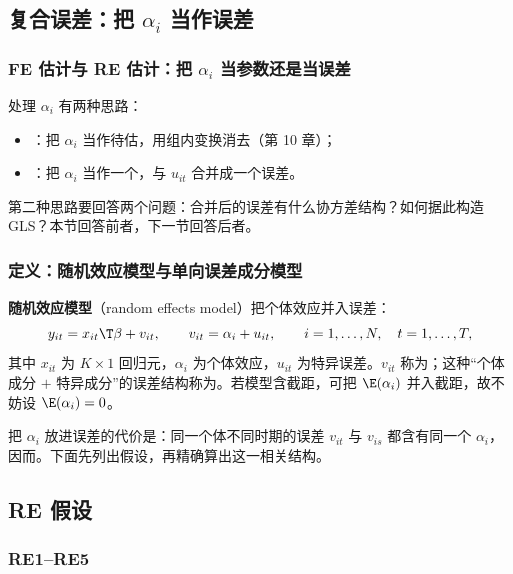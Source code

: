 \subsection{复合误差：把 \texorpdfstring{$\alpha_i$}{alpha\_i} 当作误差}

\subsubsection{FE 估计与 RE 估计：把 \texorpdfstring{$\alpha_i$}{alpha\_i} 当参数还是当误差}

处理 $\alpha_i$ 有两种思路：
\begin{itemize}
  \item {}：把 $\alpha_i$ 当作待估，用组内变换消去（第 10 章）；
  \item {}：把 $\alpha_i$ 当作一个，与 $u_{it}$ 合并成一个误差。
\end{itemize}
第二种思路要回答两个问题：合并后的误差有什么协方差结构？如何据此构造 GLS？本节回答前者，下一节回答后者。

\subsubsection{定义：随机效应模型与单向误差成分模型}

\begin{defn}[随机效应模型]\label{def:U11a-re}
\textbf{随机效应模型}（random effects model）把个体效应并入误差：
\begin{equation}\label{eq:U11a-re}
y_{it}=x_{it}\T\beta+v_{it},\qquad v_{it}=\alpha_i+u_{it},\qquad i=1,\dots,N,\quad t=1,\dots,T,
\end{equation}
其中 $x_{it}$ 为 $K\times1$ 回归元，$\alpha_i$ 为个体效应，$u_{it}$ 为特异误差。$v_{it}$ 称为；这种“个体成分 $+$ 特异成分”的误差结构称为。若模型含截距，可把 $\E(\alpha_i)$ 并入截距，故不妨设 $\E(\alpha_i)=0$。
\end{defn}

把 $\alpha_i$ 放进误差的代价是：同一个体不同时期的误差 $v_{it}$ 与 $v_{is}$ 都含有同一个 $\alpha_i$，因而。下面先列出假设，再精确算出这一相关结构。

\subsection{RE 假设}

\subsubsection{RE1–RE5}

